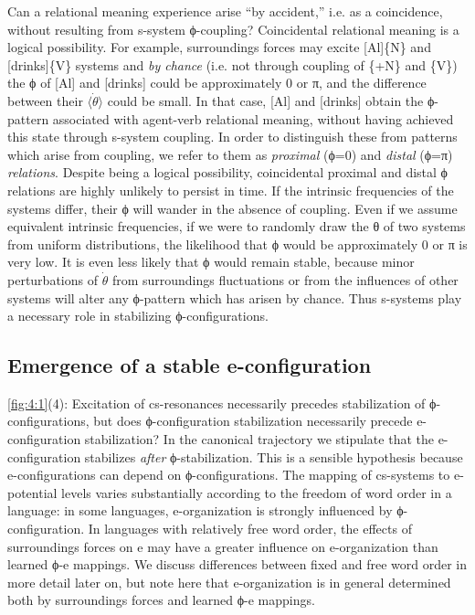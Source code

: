   Can a relational meaning experience arise “by accident,” i.e. as a coincidence, without resulting from s-system ϕ-coupling? Coincidental relational meaning is a logical possibility. For example, surroundings forces may excite [Al]\{N\} and [drinks]\{V\} systems and \textit{by chance} (i.e. not through coupling of \{+N\} and \{V\}) the ϕ of [Al] and [drinks] could be approximately 0 or π, and the difference between their $\langle\dot{\theta}\rangle$ could be small. In that case, [Al] and [drinks] obtain the ϕ-pattern associated with agent-verb relational meaning, without having achieved this state through s-system coupling. In order to distinguish these from patterns which arise from coupling, we refer to them as \textit{proximal} (ϕ=0) and \textit{distal} (ϕ=π) \textit{relations}. Despite being a logical possibility, coincidental proximal and distal ϕ relations are highly unlikely to persist in time. If the intrinsic frequencies of the systems differ, their ϕ will wander in the absence of coupling. Even if we assume equivalent intrinsic frequencies, if we were to randomly draw the θ of two systems from uniform distributions, the likelihood that ϕ would be approximately 0 or π is very low. It is even less likely that ϕ would remain stable, because minor perturbations of $\dot{\theta}$ from surroundings fluctuations or from the influences of other systems will alter any ϕ-pattern which has arisen by chance. Thus s-systems play a necessary role in stabilizing ϕ-configurations.

\subsection{Emergence of a stable e-configuration}

\ref{fig:4:1}(4): Excitation of cs-resonances necessarily precedes stabilization of ϕ-configurations, but does ϕ-configuration stabilization necessarily precede e-configuration stabilization? In the canonical trajectory we stipulate that the e-configuration stabilizes \textit{after} ϕ-stabilization. This is a sensible hypothesis because e-configurations can depend on ϕ-configurations. The mapping of cs-systems to e-potential levels varies substantially according to the freedom of word order in a language: in some languages, e-organization is strongly influenced by ϕ-configuration. In languages with relatively free word order, the effects of surroundings forces on e may have a greater influence on e-organization than learned ϕ-e mappings. We discuss differences between fixed and  free word order in more detail later on, but note here that e-organization is in general determined both by surroundings forces and learned ϕ-e mappings.

